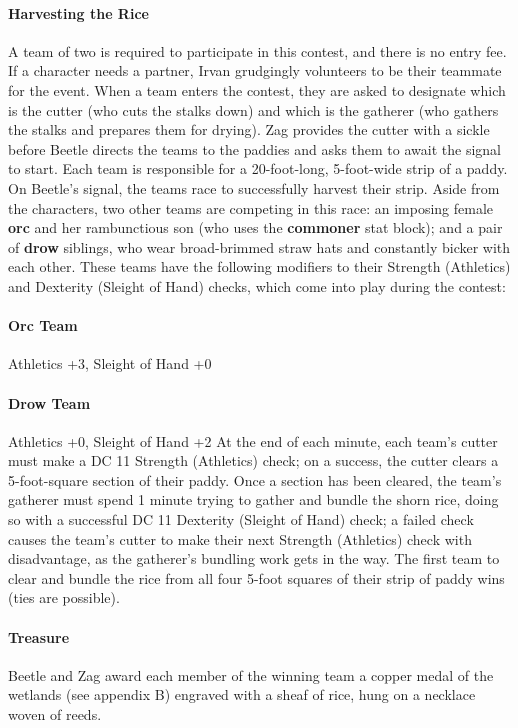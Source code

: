 \documentclass[10pt,a4,twoside,twocolumn,openany,nodeprecatedcode]{dndbook}
\begin{document}
\paragraph{Harvesting the Rice}
A team of two is required to participate in this contest, and there is no entry fee. If a character needs a partner, Irvan grudgingly volunteers to be their teammate for the event. When a team enters the contest, they are asked to designate which is the cutter (who cuts the stalks down) and which is the gatherer (who gathers the stalks and prepares them for drying). Zag provides the cutter with a sickle before Beetle directs the teams to the paddies and asks them to await the signal to start.
Each team is responsible for a 20-foot-long, 5-foot-wide strip of a paddy. On Beetle's signal, the teams race to successfully harvest their strip. Aside from the characters, two other teams are competing in this race: an imposing female \textbf{orc} and her rambunctious son (who uses the \textbf{commoner} stat block); and a pair of \textbf{drow} siblings, who wear broad-brimmed straw hats and constantly bicker with each other. These teams have the following modifiers to their Strength (Athletics) and Dexterity (Sleight of Hand) checks, which come into play during the contest:
\paragraph{Orc Team}
Athletics +3, Sleight of Hand +0
\paragraph{Drow Team}
Athletics +0, Sleight of Hand +2
At the end of each minute, each team's cutter must make a DC 11 Strength (Athletics) check; on a success, the cutter clears a 5-foot-square section of their paddy. Once a section has been cleared, the team's gatherer must spend 1 minute trying to gather and bundle the shorn rice, doing so with a successful DC 11 Dexterity (Sleight of Hand) check; a failed check causes the team's cutter to make their next Strength (Athletics) check with disadvantage, as the gatherer's bundling work gets in the way. The first team to clear and bundle the rice from all four 5-foot squares of their strip of paddy wins (ties are possible).
\paragraph{Treasure}
Beetle and Zag award each member of the winning team a copper medal of the wetlands (see appendix B) engraved with a sheaf of rice, hung on a necklace woven of reeds.
\end{document}
